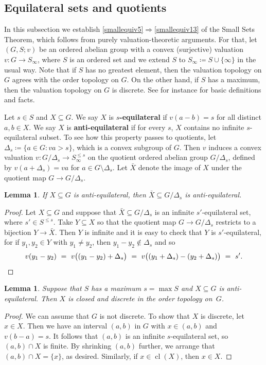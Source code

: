 \documentclass[11pt]{amsart}
\theoremstyle{plain}
\newtheorem{lemma}[thm]{Lemma}
\theoremstyle{definition}
\numberwithin{equation}{section}
\newcommand\0{\varnothing}
\DeclareMathOperator\cl{cl}
\begin{document}
\subsection{Equilateral sets and quotients}\label{subsec_equilat}
In this subsection we establish \eqref{smallequiv5}$\Rightarrow$\eqref{smallequiv13} of the Small Sets Theorem, which follows from purely valuation-theoretic arguments.
For that, let $(G, S; v)$ be an ordered abelian group with a convex (surjective) valuation $v \colon G \to S_{\infty}$, where $S$ is an ordered set and we extend $S$ to $S_{\infty} \coloneqq S \cup \{\infty\}$ in the usual way.
Note that if $S$ has no greatest element, then the valuation topology on $G$ agrees with the order topology on $G$.
On the other hand, if $S$ has a maximum, then the valuation topology on $G$ is discrete.
See for instance \cite[Chapter~2]{ADAMTT} for basic definitions and facts.

\medskip\noindent
Let $s \in S$ and $X \subseteq G$.
We say $X$ is \textbf{$s$-equilateral} if $v(a-b)=s$ for all distinct $a,b \in X$.
We say $X$ is \textbf{anti-equilateral} if for every $s$, $X$ contains no infinite $s$-equilateral subset.
To see how this property passes to quotients, let $\Delta_{s}\coloneqq\{ a \in G : va>s \}$, which is a convex subgroup of $G$.
Then $v$ induces a convex valuation $v\colon G/\Delta_{s} \to S^{\leq s}_{\infty}$ on the quotient ordered abelian group $G/\Delta_{s}$, defined by $v(a+\Delta_{s})=va$ for $a \in G \setminus \Delta_{s}$.
Let $\bar{X}$ denote the image of $X$ under the quotient map $G \to G/\Delta_{s}$.

\begin{lemma}\label{lem_equilatquot}
If $X \subseteq G$ is anti-equilateral, then $\bar{X} \subseteq G/\Delta_{s}$ is anti-equilateral.
\end{lemma}
\begin{proof}
Let $X \subseteq G$ and suppose that $\bar{X} \subseteq G/\Delta_{s}$ is an infinite $s'$-equilateral set, where $s' \in S^{\leq s}$.
Take $Y \subseteq X$ so that the quotient map $G \to G/\Delta_{s}$ restricts to a bijection $Y \to \bar{X}$.
Then $Y$ is infinite and it is easy to check that $Y$ is $s'$-equilateral, for if $y_1,y_2 \in Y$ with $y_1\neq y_2$, then $y_1-y_2 \notin \Delta_{s}$ and so
\[
v(y_1-y_2)\ =\ v\big((y_1-y_2)+\Delta_{s}\big)\ =\ v\big((y_1+\Delta_{s})-(y_2+\Delta_{s})\big)\ =\ s'. \qedhere
\]
\end{proof}

\begin{lemma}\label{lem_equilatcloseddisc}
Suppose that $S$ has a maximum $s=\max S$ and $X\subseteq G$ is anti-equilateral.
Then $X$ is closed and discrete in the order topology on~$G$.
\end{lemma}
\begin{proof}
We can assume that $G$ is not discrete.
To show that $X$ is discrete, let $x \in X$.
Then we have an interval $(a,b)$ in $G$ with $x \in (a,b)$ and $v(b-a)=s$.
It follows that $(a,b)$ is an infinite $s$-equilateral set, so $(a,b)\cap X$ is finite.
By shrinking $(a,b)$ further, we arrange that $(a,b)\cap X = \{x\}$, as desired.
Similarly, if $x \in \cl(X)$, then $x \in X$.
\end{proof}
\end{document}
